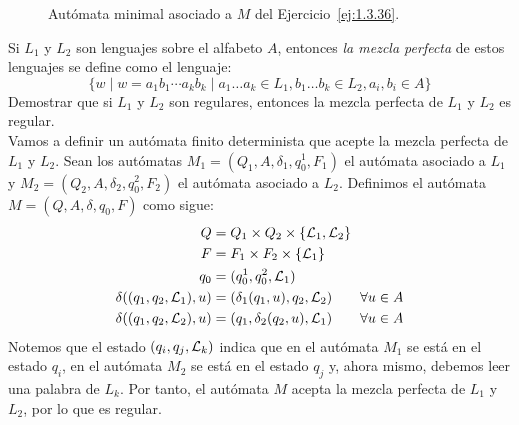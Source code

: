 \begin{ejercicio}
\begin{figure}
        \caption{Autómata minimal asociado a $M$ del Ejercicio~\ref{ej:1.3.36}.}
        \label{fig:1.3.36-M-min}
    \end{figure}
\end{ejercicio}

\begin{ejercicio} \label{ej:1.3.37}
    Si $L_1$ y $L_2$ son lenguajes sobre el alfabeto $A$, entonces \emph{la mezcla perfecta} de estos lenguajes se define como el lenguaje:
    \begin{equation*}
        \{w\mid w=a_1b_1\cdots a_kb_k \mid  a_1\ldots a_k\in L_1, b_1\ldots b_k\in L_2, a_i,b_i\in A\}
    \end{equation*}
    Demostrar que si $L_1$ y $L_2$ son regulares, entonces la mezcla perfecta de $L_1$ y $L_2$ es regular.\\

    Vamos a definir un autómata finito determinista que acepte la mezcla perfecta de $L_1$ y $L_2$.
    Sean los autómatas $M_1=(Q_1,A,\delta_1,q_0^1,F_1)$ el autómata asociado a $L_1$ y $M_2=(Q_2,A,\delta_2,q_0^2,F_2)$ el autómata asociado a $L_2$. Definimos el autómata $M=(Q,A,\delta,q_0,F)$ como sigue:
    \begin{align*}
        Q &= Q_1\times Q_2 \times \{\mathcal{L}_1,\mathcal{L}_2\}\\
        F &= F_1\times F_2 \times \{\mathcal{L}_1\}\\
        q_0 &= (q_0^1,q_0^2,\mathcal{L}_1)\\
        \delta((q_1,q_2,\mathcal{L}_1),u) &= (\delta_1(q_1,u),q_2,\mathcal{L}_2) \qquad \forall u \in A\\
        \delta((q_1,q_2,\mathcal{L}_2),u) &= (q_1,\delta_2(q_2,u),\mathcal{L}_1) \qquad \forall u \in A
    \end{align*}
    Notemos que el estado $(q_i, q_j, \mathcal{L}_k)$ indica que en el autómata $M_1$ se está en el estado $q_i$, en el autómata $M_2$ se está en el estado $q_j$ y, ahora mismo, debemos leer una palabra de $L_k$. Por tanto, el autómata $M$ acepta la mezcla perfecta de $L_1$ y $L_2$, por lo que es regular.
\end{ejercicio}

